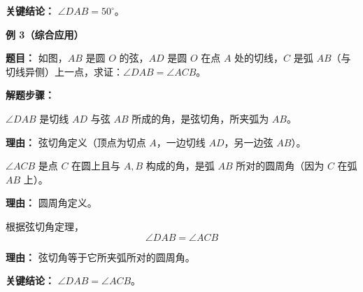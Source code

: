 \begin{examplebox}
	\textbf{\textcolor{CExample}{关键结论：}}
	$\angle DAB = 50^\circ$。

	\medskip
	\textbf{\textcolor{CExample}{例 3（综合应用）}}

	\textbf{\textcolor{CExample}{题目：}}
	如图，$AB$ 是圆 $O$ 的弦，$AD$ 是圆 $O$ 在点 $A$ 处的切线，$C$ 是弧 $AB$（与切线异侧）上一点，求证：$\angle DAB = \angle ACB$。

	\textbf{\textcolor{CExample}{解题步骤：}}
	\begin{description}[style=nextline, leftmargin=2.8em, labelsep=0.5em, itemsep=0.45em]
		\item[\textbf{第一步（识别弦切角）：}] $\angle DAB$ 是切线 $AD$ 与弦 $AB$ 所成的角，是弦切角，所夹弧为 $AB$。
			\par\textbf{理由：} 弦切角定义（顶点为切点 $A$，一边切线 $AD$，另一边弦 $AB$）。
		\item[\textbf{第二步（识别圆周角）：}] $\angle ACB$ 是点 $C$ 在圆上且与 $A,B$ 构成的角，是弧 $AB$ 所对的圆周角（因为 $C$ 在弧 $AB$ 上）。
			\par\textbf{理由：} 圆周角定义。
		\item[\textbf{第三步（套用定理）：}] 根据弦切角定理，
			\[
				\angle DAB = \angle ACB
			\]
			\par\textbf{理由：} 弦切角等于它所夹弧所对的圆周角。
	\end{description}

	\textbf{\textcolor{CExample}{关键结论：}}
	$\angle DAB = \angle ACB$。
\end{examplebox}
